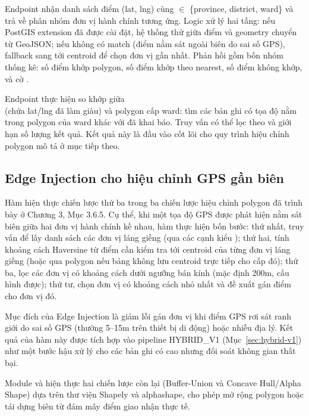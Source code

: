 Endpoint  nhận danh sách điểm (lat, lng) cùng  $\in$ \{province, district, ward\} và trả về phân nhóm đơn vị hành chính tương ứng. Logic xử lý hai tầng: nếu PostGIS extension đã được cài đặt, hệ thống thử  giữa điểm và geometry chuyển từ GeoJSON; nếu không có match (điểm nằm sát ngoài biên do sai số GPS), fallback sang  tới centroid để chọn đơn vị gần nhất. Phản hồi gồm bốn nhóm thống kê: số điểm khớp polygon, số điểm khớp theo nearest, số điểm không khớp, và cờ .

Endpoint  thực hiện so khớp giữa \\  (chứa lat/lng đã làm giàu) và polygon cấp ward: tìm các bản ghi có tọa độ nằm trong polygon của ward khác với  đã khai báo. Truy vấn có thể lọc theo  và giới hạn số lượng kết quả. Kết quả này là đầu vào cốt lõi cho quy trình hiệu chỉnh polygon mô tả ở mục tiếp theo.

\subsection{Edge Injection cho hiệu chỉnh GPS gần biên}
\label{sec:edge-inject}

Hàm  hiện thực chiến lược thứ ba trong ba chiến lược hiệu chỉnh polygon đã trình bày ở Chương 3, Mục 3.6.5. Cụ thể, khi một tọa độ GPS được phát hiện nằm sát biên giữa hai đơn vị hành chính kề nhau, hàm thực hiện bốn bước: thứ nhất, truy vấn  để lấy danh sách các đơn vị láng giềng (qua các cạnh kiểu ); thứ hai, tính khoảng cách Haversine từ điểm cần kiểm tra tới centroid của từng đơn vị láng giềng (hoặc qua polygon nếu bảng không lưu centroid trực tiếp cho cấp đó); thứ ba, lọc các đơn vị có khoảng cách dưới ngưỡng bán kính (mặc định 200m, cấu hình được); thứ tư, chọn đơn vị có khoảng cách nhỏ nhất và đề xuất gán điểm cho đơn vị đó.

Mục đích của Edge Injection là giảm lỗi gán đơn vị khi điểm GPS rơi sát ranh giới do sai số GPS (thường 5--15m trên thiết bị di động) hoặc nhiễu địa lý. Kết quả của hàm này được tích hợp vào pipeline HYBRID\_V1 (Mục~\ref{sec:hybrid-v1}) như một bước hậu xử lý cho các bản ghi có  cao nhưng đối soát không gian thất bại.

Module  và  hiện thực hai chiến lược còn lại (Buffer-Union và Concave Hull/Alpha Shape) dựa trên thư viện Shapely \cite{Shapely2024} và alphashape, cho phép mở rộng polygon hoặc tái dựng biên từ đám mây điểm giao nhận thực tế.


